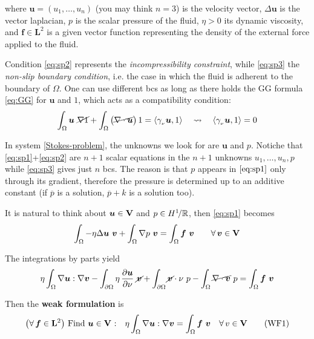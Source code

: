where $\bm u=(u_1,\dots,u_n)$ (you may think $n=3$) is the velocity vector, $\Delta\bm u$ is the vector laplacian, $p$ is the scalar pressure of the fluid, $\eta>0$ its dynamic viscosity, and $\bm f\in\mathbf{L}^2$ is a given vector function representing the density of the external force applied to the fluid.

Condition \eqref{eq:sp2} represents the \emph{incompressibility constraint}, while \eqref{eq:sp3} the \emph{non-slip boundary condition}, i.e. the case in which the fluid is adherent to the boundary of $\Omega$. One can use different bcs as long as there holds the GG formula \eqref{eq:GG} for $\bm u$ and $1$, which acts as a compatibility condition:
\begin{equation*}
\int_\Omega \bm u\ \cancel{\nabla 1} + \int_\Omega \big(\cancel{\nabla\cdot \bm u}\big)\, 1= \left\langle \gamma_{_\nu}\bm u, 1 \right\rangle\quad\leadsto\quad \left\langle \gamma_{_\nu}\bm u, 1 \right\rangle=0
\end{equation*}

In system \eqref{Stokes-problem}, the unknowns we look for are $\bm u$ and $p$. Notiche that \eqref{eq:sp1}+\eqref{eq:sp2} are $n+1$ scalar equations in the $n+1$ unknowns $u_1,\dots,u_n,p$ while \eqref{eq:sp3} gives just $n$ bcs. The reason is that $p$ appears in $\eqref{eq:sp1}$ only through its gradient, therefore the pressure is determined up to an additive constant (if $\overline{p}$ is a solution, $\overline{p}+k$ is a solution too). 

\noindent\rlap{\rule[1.5ex]{0.495\textwidth}{.2pt}}

\vspace{-0.5em}


It is natural to think about $\bm u\in\mathbf{V}$ and $p\in H^1\!/\mathbb{R}$, then \eqref{eq:sp1} becomes
\begin{equation*}
\int_\Omega -\eta\Delta\bm u\ \bm v +\int_\Omega \nabla p\ \bm v =\int_\Omega \bm f\ \bm v\qquad \forall\, \bm v\in\mathbf{V}
\end{equation*}

The integrations by parts yield
\begin{equation*}
\eta \int_\Omega \nabla\bm u:\nabla\bm v-\int_{\partial\Omega}\eta\,\frac{\partial \bm u}{\partial \nu}\ \cancel{\bm v}+\int_{\partial\Omega} \cancel{\bm v} \cdot \nu\ p -\int_\Omega \cancel{\nabla\cdot\bm v}\ p = \int_\Omega \bm f\ \bm v
\end{equation*}

Then the \textbf{weak formulation} is 
\begin{equation*}
\big(\forall\,\bm f\in\mathbf{L}^2\big)\text{ Find }\bm u\in \mathbf{V}\text{ :}\quad \eta\int_\Omega \nabla \bm u : \nabla \bm v=\int_\Omega \bm f\ \bm v\quad \forall\,v\in\mathbf{V}\tag{WF1}
\end{equation*}

